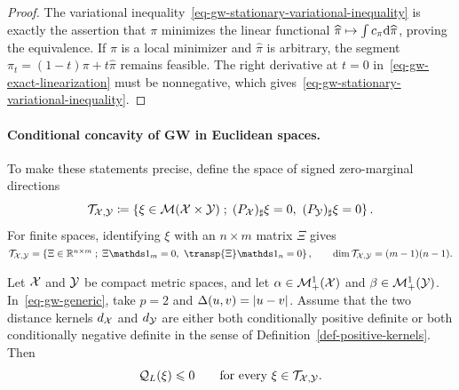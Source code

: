 \begin{proof}
The variational inequality~\eqref{eq-gw-stationary-variational-inequality} is exactly the assertion that $\pi$ minimizes the linear functional $\widehat\pi\mapsto\int c_\pi\mathrm{d}\widehat\pi$, proving the equivalence. If $\pi$ is a local minimizer and $\widehat\pi$ is arbitrary, the segment $\pi_t=(1-t)\pi+t\widehat\pi$ remains feasible. The right derivative at $t=0$ in~\eqref{eq-gw-exact-linearization} must be nonnegative, which gives~\eqref{eq-gw-stationary-variational-inequality}.
\end{proof}
\paragraph{Conditional concavity of GW in Euclidean spaces.}
To make these statements precise, define the space of signed zero-marginal directions
\begin{equation}\label{eq-gw-zero-marginal-space}
\mathcal T_{\X,\Y}
\eqdef
\enscond{\xi\in\Mm(\X\times\Y)}{(P_\X)_\sharp\xi=0,\ (P_\Y)_\sharp\xi=0}.
\end{equation}
For finite spaces, identifying $\xi$ with an $n\times m$ matrix $\Xi$ gives \(\mathcal T_{\X,\Y} = \enscond{\Xi\in\RR^{n\times m}}{\Xi\ones_m=0,\ \transp{\Xi}\ones_n=0}, \qquad \dim\mathcal T_{\X,\Y}=(m-1)(n-1).\)
\begin{prop}\label{prop-gw-conditional-concavity}
Let $\mathcal{X}$ and $\mathcal{Y}$ be compact metric spaces, and let $\alpha\in\mathcal{M}_+^1(\mathcal{X})$ and $\beta\in\mathcal{M}_+^1(\mathcal{Y})$. In~\eqref{eq-gw-generic}, take $p=2$ and $\Delta(u,v)=|u-v|$. Assume that the two distance kernels $d_{\mathcal{X}}$ and $d_{\mathcal{Y}}$ are either both conditionally positive definite or both conditionally negative definite in the sense of Definition~\ref{def-positive-kernels}. Then
\begin{equation}\label{eq-gw-conditional-negative-form}
\mathcal Q_L(\xi)\leqslant0
\qquad\text{for every }\xi\in\mathcal T_{\mathcal{X},\mathcal{Y}}.
\end{equation}
\end{prop}
